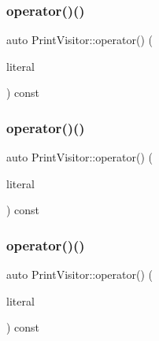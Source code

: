 \mbox{\label{struct_print_visitor_a381e3fa143f2c8e8c85d86e5ed6441b5}} 
\subsubsection{\texorpdfstring{operator()()}{operator()()}\hspace{0.1cm}{\footnotesize\ttfamily [3/38]}}
{\footnotesize\ttfamily auto Print\+Visitor\+::operator() (\begin{DoxyParamCaption}\item[{const \hyperlink{struct_null_literal}{Null\+Literal} \&}]{literal }\end{DoxyParamCaption}) const\hspace{0.3cm}{\ttfamily [inline]}}

\mbox{\label{struct_print_visitor_a24a148187b20cd3f11ebaf7414024d3a}} 
\subsubsection{\texorpdfstring{operator()()}{operator()()}\hspace{0.1cm}{\footnotesize\ttfamily [4/38]}}
{\footnotesize\ttfamily auto Print\+Visitor\+::operator() (\begin{DoxyParamCaption}\item[{const \hyperlink{struct_boolean_literal}{Boolean\+Literal} \&}]{literal }\end{DoxyParamCaption}) const\hspace{0.3cm}{\ttfamily [inline]}}

\mbox{\label{struct_print_visitor_aa99f46059d380f55159e1a8f8c07603e}} 
\subsubsection{\texorpdfstring{operator()()}{operator()()}\hspace{0.1cm}{\footnotesize\ttfamily [5/38]}}
{\footnotesize\ttfamily auto Print\+Visitor\+::operator() (\begin{DoxyParamCaption}\item[{const \hyperlink{struct_numeric_literal}{Numeric\+Literal} \&}]{literal }\end{DoxyParamCaption}) const\hspace{0.3cm}{\ttfamily [inline]}}

